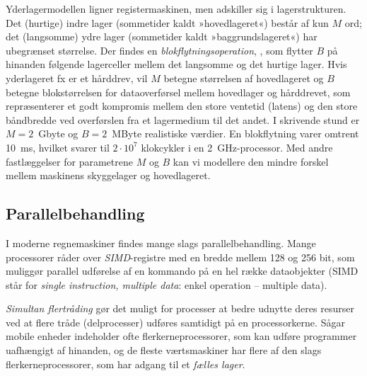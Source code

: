 Yderlagermodellen ligner registermaskinen, men adskiller sig i lagerstrukturen.
Det (hurtige) indre lager
(sommetider kaldt »hovedlageret«) består af kun $M$ ord; det (langsomme) ydre lager (sommetider kaldt »baggrundslageret«) har ubegrænset størrelse.
Der findes en \emph{blokflytnings\-operation},
,
som flytter $B$ på hinanden følgende lagerceller mellem det langsomme og det hurtige lager.
Hvis yderlageret fx er et hårddrev,
vil $M$ betegne størrelsen af hovedlageret og $B$ betegne blokstørrelsen for dataoverførsel mellem hovedlager og hårddrevet, som repræsenterer et godt kompromis mellem den store ventetid (latens)
og den store båndbredde
ved overførslen fra et lagermedium til det andet.
I skrivende stund er $M= 2$~Gbyte og $B=2$~MByte realistiske værdier.
En blokflytning varer omtrent 10~ms, hvilket svarer til $2\cdot 10^7$ klokcykler
i en 2~GHz-processor.
Med andre fastlæggelser for parametrene $M$ og $B$ kan vi modellere den mindre forskel mellem maskinens skyggelager og hovedlageret.

\subsection{Parallelbehandling}

I moderne regnemaskiner findes mange slags parallelbehandling.
Mange processorer råder over \emph{SIMD}-registre
med en bredde mellem 128 og 256 bit, som muliggør parallel udførelse af en kommando på en hel række dataobjekter (SIMD står for \emph{single instruction, multiple data}: enkel operation -- multiple data).

\emph{Simultan flertråding}
gør det muligt for processer at bedre udnytte deres resurser ved at flere tråde (delprocesser) udføres samtidigt på en processorkerne.
Sågar mobile enheder
indeholder ofte flerkerneprocessorer,
som kan udføre programmer uafhængigt af hinanden, og de fleste værtsmaskiner har flere af den slags flerkerneprocessorer, som har adgang til et \emph{fælles lager}.

